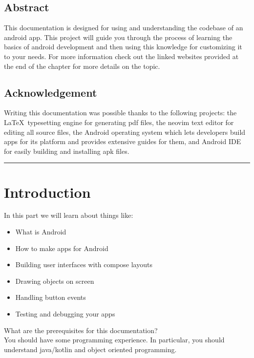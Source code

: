 \documentclass[12pt,oneside]{book}
\begin{document}
\setcounter{tocdepth}{1}
\tableofcontents \newpage

\lhead{} \chead{} \rhead{}
\Large \centering
\section*{\Huge Abstract} 
This documentation is designed for using and understanding the codebase of an android app. This project will guide you through the process of learning the basics of android development and then using this knowledge for customizing it to your needs. For more information check out the linked websites provided at the end of the chapter for more details on the topic.
\vspace*{3\baselineskip}

\section*{\Huge Acknowledgement} 
Writing this documentation was possible thanks to the following projects: the \LaTeX\ typesetting engine for generating pdf files, the neovim text editor for editing all source files, the Android operating system which lets developers build apps for its platform and provides extensive guides for them, and Android IDE for easily building and installing apk files.

\vfill \rule{\textwidth}{0.4pt}
 \large \raggedright

\chapter{Introduction}
In this part we will learn about things like:
\begin{itemize}
  \item What is Android
  \item How to make apps for Android
  \item Building user interfaces with compose layouts
  \item Drawing objects on screen
  \item Handling button events
  \item Testing and debugging your apps
\end{itemize}
What are the prerequisites for this documentation? \\
You should have some programming experience. In particular, you should understand java/kotlin and object oriented programming.
\end{document}
